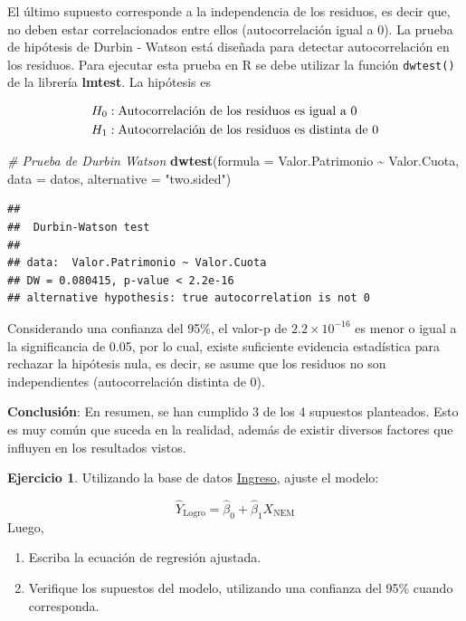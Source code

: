\documentclass[
  11pt,
]{book}
\newenvironment{Shaded}{\begin{snugshade}}{\end{snugshade}}
\newcommand{\AttributeTok}[1]{\textcolor[rgb]{0.13,0.29,0.53}{#1}}
\newcommand{\CommentTok}[1]{\textcolor[rgb]{0.56,0.35,0.01}{\textit{#1}}}
\newcommand{\FunctionTok}[1]{\textcolor[rgb]{0.13,0.29,0.53}{\textbf{#1}}}
\newcommand{\NormalTok}[1]{#1}
\newcommand{\SpecialCharTok}[1]{\textcolor[rgb]{0.81,0.36,0.00}{\textbf{#1}}}
\newcommand{\StringTok}[1]{\textcolor[rgb]{0.31,0.60,0.02}{#1}}
\providecommand{\tightlist}{%
  \setlength{\itemsep}{0pt}\setlength{\parskip}{0pt}}
\theoremstyle{definition}
\theoremstyle{definition}
\theoremstyle{definition}
\newtheorem{exercise}{Ejercicio}[chapter]
\theoremstyle{definition}
\theoremstyle{remark}
\begin{document}
El último supuesto corresponde a la independencia de los residuos, es decir que, no deben estar correlacionados entre ellos (autocorrelación igual a 0). La prueba de hipótesis de Durbin - Watson está diseñada para detectar autocorrelación en los residuos. Para ejecutar esta prueba en R se debe utilizar la función \texttt{dwtest()} de la librería \textbf{lmtest}. La hipótesis es

\begin{equation}
\notag
\begin{split}
H_0&: \text{Autocorrelación de los residuos es igual a 0}\\
H_1&: \text{Autocorrelación de los residuos es distinta de 0}\\
\end{split}
\end{equation}

\begin{Shaded}
\begin{Highlighting}[]
\CommentTok{\# Prueba de Durbin Watson}
\FunctionTok{dwtest}\NormalTok{(}\AttributeTok{formula =}\NormalTok{ Valor.Patrimonio }\SpecialCharTok{\textasciitilde{}}\NormalTok{ Valor.Cuota,}
       \AttributeTok{data =}\NormalTok{ datos,}
       \AttributeTok{alternative =} \StringTok{"two.sided"}\NormalTok{)}
\end{Highlighting}
\end{Shaded}

\begin{verbatim}
## 
##  Durbin-Watson test
## 
## data:  Valor.Patrimonio ~ Valor.Cuota
## DW = 0.080415, p-value < 2.2e-16
## alternative hypothesis: true autocorrelation is not 0
\end{verbatim}

Considerando una confianza del 95\%, el valor-p de \(2.2 \times 10^{-16}\) es menor o igual a la significancia de 0.05, por lo cual, existe suficiente evidencia estadística para rechazar la hipótesis nula, es decir, se asume que los residuos no son independientes (autocorrelación distinta de 0).

\textbf{Conclusión}: En resumen, se han cumplido 3 de los 4 supuestos planteados. Esto es muy común que suceda en la realidad, además de existir diversos factores que influyen en los resultados vistos.

\begin{exercise}

Utilizando la base de datos \hyperref[Ingreso]{Ingreso}, ajuste el modelo:

\[\widehat{Y}_{\text{Logro}} = \widehat{\beta}_0 + \widehat{\beta}_1X_{\text{NEM}}\]
Luego,

\begin{enumerate}
\def\labelenumi{\arabic{enumi}.}
\tightlist
\item
  Escriba la ecuación de regresión ajustada.
\item
  Verifique los supuestos del modelo, utilizando una confianza del 95\% cuando corresponda.
\end{enumerate}

\end{exercise}
\end{document}
